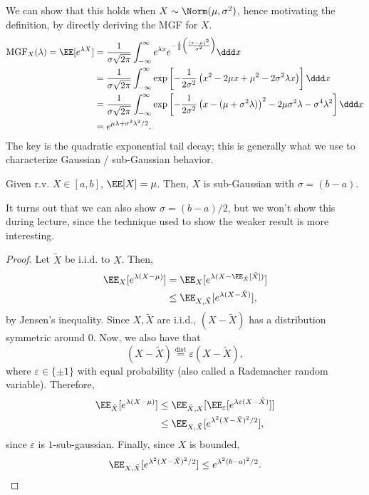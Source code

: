 We can show that this holds when $X\sim \Norm(\mu, \sigma^2)$, hence motivating the definition, by directly deriving the MGF for $X$.
\begin{align*}
	\text{MGF}_X(\lambda) = \EE[e^{\lambda X}] &= \frac{1}{\sigma \sqrt{2\pi}}\int_{-\infty}^{\infty}e^{\lambda x}e^{-\frac{1}{2}\left(\frac{(x-\mu)^2}{\sigma^2}\right)}\ddd x \\
																						 &= \frac{1}{\sigma\sqrt{2\pi}}\int_{-\infty}^{\infty}\exp\left[-\frac{1}{2\sigma^2}\left(x^2-2\mu x+\mu^2 - 2\sigma^2\lambda x\right)\right] \ddd x\\
																						 &= \frac{1}{\sigma\sqrt{2\pi}}\int_{-\infty}^{\infty}\exp\left[-\frac{1}{2\sigma^2}\left(x - (\mu + \sigma^2\lambda)\right)^2 - 2\mu\sigma^2\lambda - \sigma^4\lambda^2\right]\ddd x \\
																						 &= e^{\mu\lambda + \sigma^2\lambda^2/2}.
\end{align*}
The key is the quadratic exponential tail decay; this is generally what we use to characterize Gaussian / sub-Gaussian behavior. 

\begin{theorem}

Given r.v. $X\in [a,b]$, $\EE[X] = \mu$. Then, $X$ is sub-Gaussian with $\sigma=(b-a)$.
\end{theorem}

It turns out that we can also show $\sigma = (b-a)/2$, but we won't show this during lecture, since the technique used to show the weaker result is more interesting.

\begin{proof}
Let $\tilde{X}$ be i.i.d. to $X$. Then,
\begin{align*}
	\EE_X[e^{\lambda(X-\mu)}] &= \EE_X[e^{\lambda(X - \EE_{\tilde{X}}[\tilde{X}])}] \\
														&\leq \EE_{X, \tilde{X}}[e^{\lambda(X-\tilde{X})}],
\end{align*}
by Jensen's inequality. Since $X,\tilde{X}$ are i.i.d., $(X-\tilde{X})$ has a distribution symmetric around $0$. Now, we also have that
\[(X-\tilde{X}) \overset{\text{dist}}{=} \varepsilon(X-\tilde{X}),\] 
where $\varepsilon \in \{\pm 1\}$ with equal probability (also called a \ac{Rademacher} random variable). Therefore, 
\begin{align*}
	\EE_{\tilde{X}}[e^{\lambda(X-\mu)}]&\leq \EE_{\tilde{X},X}[\EE_{\varepsilon}[e^{\lambda\varepsilon(X-\tilde{X})}]] \\
																		 &\leq \EE_{X, \tilde{X}}[e^{\lambda^2(X-\tilde{X})^2/2}],
\end{align*}
since $\varepsilon$ is $1$-sub-gaussian. Finally, since $X$ is bounded, 
\begin{align*}
	\EE_{X, \tilde{X}}[e^{\lambda^2(X-\tilde{X})^2/2}] \leq e^{\lambda^2(b-a)^2/2}.
\end{align*}
\end{proof}

